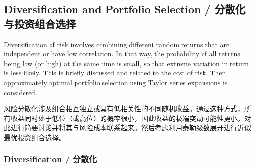 \subsection{Diversification and Portfolio Selection / 分散化与投资组合选择}

\begin{original}
Diversification of risk involves combining different random returns that are independent or have low correlation. In that way, the probability of all returns being low (or high) at the same time is small, so that extreme variation in return is less likely. This is briefly discussed and related to the cost of risk. Then approximately optimal portfolio selection using Taylor series expansions is considered.
\end{original}
\begin{translation}
风险分散化涉及组合相互独立或具有低相关性的不同随机收益。通过这种方式，所有收益同时处于低位（或高位）的概率很小，因此收益的极端变动可能性更小。对此进行简要讨论并将其与风险成本联系起来。然后考虑利用泰勒级数展开进行近似最优投资组合选择。
\end{translation}

\subsubsection{Diversification / 分散化}


